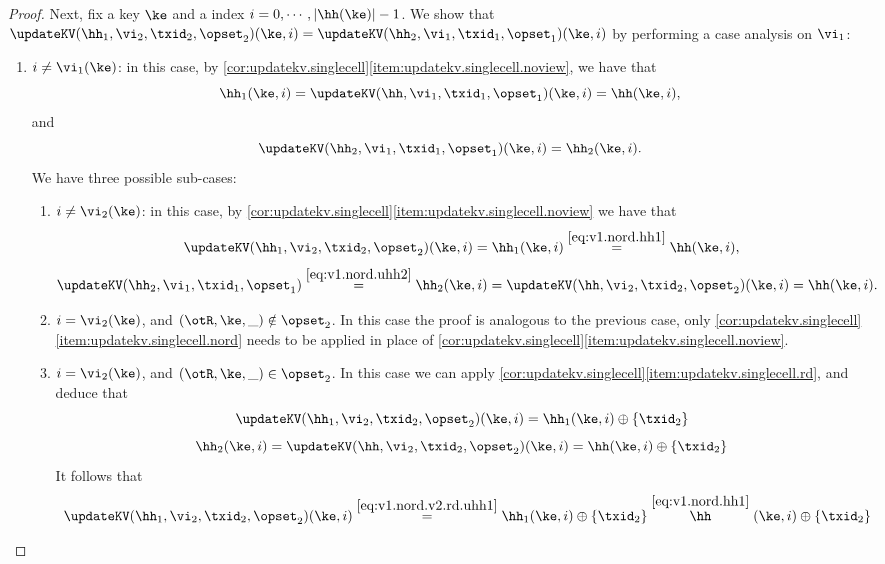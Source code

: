 \begin{proof}
Next, fix a key $\ke$ and a index $i =0, \cdots, \lvert \hh(\ke) \rvert - 1$. 
We show that $\updateKV(\hh_1,\vi_2,\txid_2,\opset_2)(\ke, i) = \updateKV(\hh_2, \vi_1, \txid_1, \opset_1)(\ke, i)$ 
by performing a case analysis on $\vi_1$: 
\begin{enumerate}
\item $i \neq \vi_1(\ke)$: in this case, by \cref{cor:updatekv.singlecell}\eqref{item:updatekv.singlecell.noview}, 
we have that 
\begin{equation}
\hh_1(\ke, i) = \updateKV(\hh, \vi_1, \txid_1, \opset_1)(\ke, i) = \hh(\ke, i), 
\label{eq:v1.nord.hh1}
\end{equation}
and 
\begin{equation}
\updateKV(\hh_2, \vi_1, \txid_1, \opset_1)(\ke, i) = \hh_2(\ke, i).
\label{eq:v1.nord.uhh2}
\end{equation}
We have three possible sub-cases: 
\begin{enumerate}
\item $i \neq \vi_2(\ke)$: in this case, by \cref{cor:updatekv.singlecell}\eqref{item:updatekv.singlecell.noview} we have that 
\[\updateKV(\hh_1, \vi_2, \txid_2, \opset_2)(\ke, i) = 
\hh_1(\ke, i) \stackrel{\eqref{eq:v1.nord.hh1}}{=} \hh(\ke, i), 
\]
\[
\updateKV(\hh_2, \vi_1, \txid_1, \opset_1) \stackrel{\eqref{eq:v1.nord.uhh2}}{=} \hh_2(\ke,i) = 
\updateKV(\hh, \vi_2, \txid_2, \opset_2)(\ke, i) = \hh(\ke, i).
\]
\item $i = \vi_2(\ke)$, and $(\otR, \ke, \_) \notin \opset_2$. In this case the proof is analogous to the previous case, 
only \cref{cor:updatekv.singlecell}\eqref{item:updatekv.singlecell.nord} needs to be applied in place 
of \cref{cor:updatekv.singlecell}\eqref{item:updatekv.singlecell.noview}.
\item $i = \vi_2(\ke)$, and $(\otR, \ke, \_) \in \opset_2$. In this case we can apply \cref{cor:updatekv.singlecell}\eqref{item:updatekv.singlecell.rd}, 
and deduce that 
\begin{equation}
\updateKV(\hh_1, \vi_2, \txid_2, \opset_2)(\ke, i) = \hh_1(\ke, i) \oplus \{\txid_2\}
\label{eq:v1.nord.v2.rd.uhh1}
\end{equation}
\begin{equation}
\hh_2(\ke, i) = \updateKV(\hh, \vi_2, \txid_2, \opset_2)(\ke, i) = \hh(\ke,i) \oplus \{\txid_2\}
\label{eq:v1.nord.v2.rd.hh2}
\end{equation}
It follows that 
\[
\begin{array}{l}
\updateKV(\hh_1, \vi_2, \txid_2, \opset_2)(\ke, i) \stackrel{\eqref{eq:v1.nord.v2.rd.uhh1}}{=} \hh_1(\ke, i) \oplus \{\txid_2 \} \stackrel{\eqref{eq:v1.nord.hh1}} \hh(\ke, i) \oplus \{\txid_2\}\\

\end{array}\]
\end{enumerate}
\end{enumerate}
\end{proof}
